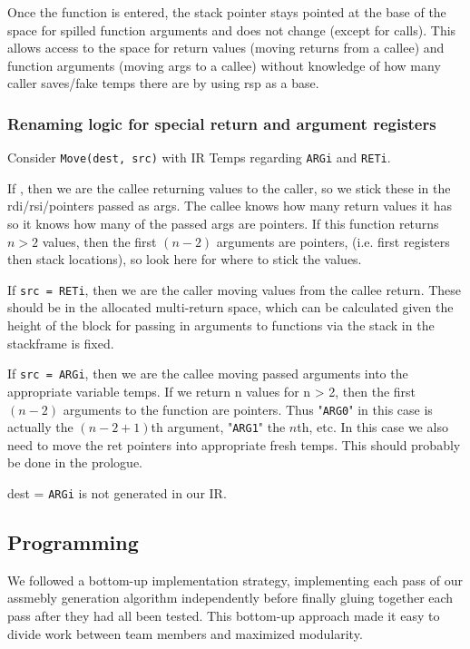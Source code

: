 \documentclass{hw}
\begin{document}
Once the function is entered, the stack pointer stays pointed at the base of the
space for spilled function arguments and does not change (except for calls).
This allows access to the space for return values (moving returns from a callee)
and function arguments (moving args to a callee) without knowledge of how many caller
saves/fake temps there are by using rsp as a base.

\subsubsection{Renaming logic for special return and argument registers}
Consider \texttt{Move(dest, src)} with IR Temps regarding \texttt{ARGi} and \texttt{RETi}.

If , then we are the callee returning values to the caller,
so we stick these in the rdi/rsi/pointers passed as args. The callee
knows how many return values it has so it knows how many of the passed
args are pointers. If this function returns $n > 2$ values, then the
first $(n-2)$ arguments are pointers, (i.e. first registers then stack
locations), so look here for where to stick the values.

If \texttt{src = RETi}, then we are the caller moving values from the callee
return. These should be in the allocated multi-return space, which can
be calculated given the height of the block for passing in arguments
to functions via the stack in the stackframe is fixed.

If \texttt{src = ARGi}, then we are the callee moving passed arguments into
the appropriate variable temps. If we return n values for n > 2, then
the first $(n-2)$ arguments to the function are pointers. Thus "\texttt{ARG0}"
in this case is actually the $(n-2+1)$th argument, "\texttt{ARG1}" the $n$th, etc. 
In this case we also need to move the ret pointers into appropriate
fresh temps. This should probably be done in the prologue.

dest = \texttt{ARGi} is not generated in our IR. 


\subsection{Programming}
We followed a bottom-up implementation strategy, implementing each pass of our
assmebly generation algorithm independently before finally gluing together each
pass after they had all been tested. This bottom-up approach made it easy to
divide work between team members and maximized modularity.
\end{document}
